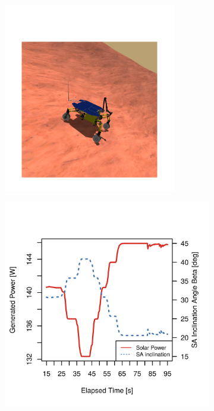 \begin{figure}[h]
\captionsetup[subfigure]{justification=centering}
\vspace{-3ex}
	\centering
    \setlength{\subfigureWidth}{0.50\textwidth}
    \setlength{\graphicsHeight}{80mm}
    \hypersetup{hidelinks=true}%
    \begin{subfigure}[t]{\subfigureWidth}
        \centering
        \includegraphics[height=83mm]{sections/design/simulation/images/counter-slope.png}
		\label{fig:sub:rover-slope-compensation-simulation}
    \end{subfigure}\hfill
    \begin{subfigure}[t]{\subfigureWidth}
        \centering
        \includegraphics[height=\graphicsHeight]{sections/design/simulation/plots/slope-compensation.png}

\end{subfigure}
\end{figure}
